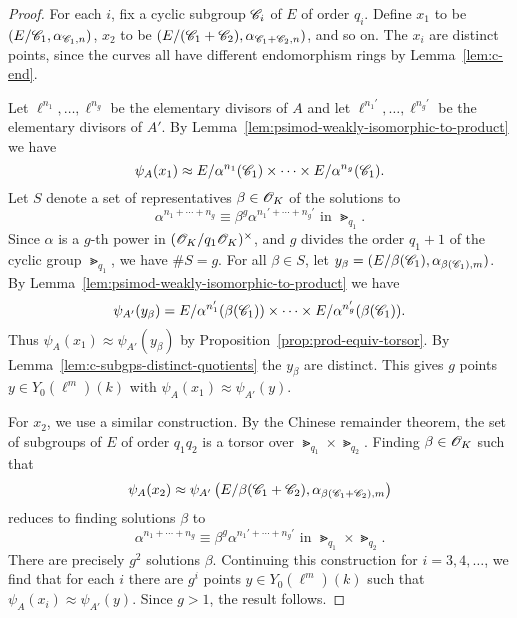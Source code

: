 \documentclass{amsart}
\begin{document}
\begin{proof}
    For each $i$, fix a cyclic subgroup $\mathscr{C}_i$ of $E$ of order $q_i$. Define $x_1$ to be $(E/\mathscr{C}_1,\alpha_{\mathscr{C}_1,n})$, $x_2$ to be $(E/(\mathscr{C}_1 + \mathscr{C}_2), \alpha_{\mathscr{C}_1 + \mathscr{C}_2,n})$, and so on. The $x_i$ are distinct points, since the curves all have different endomorphism rings by Lemma~\ref{lem:c-end}.

Let $\ell^{n_1},\dots,\ell^{n_g}$ be the elementary divisors of $A$  and let $\ell^{n_1'},\dots,\ell^{n_g'}$ be the elementary divisors of $A'$.
By Lemma~\ref{lem:psimod-weakly-isomorphic-to-product} we have $$\psi_{A}(x_1) \approx E/\alpha^{n_1}(\mathscr{C}_1) \times \cdots \times E/\alpha^{n_g}(\mathscr{C}_1).$$
    Let $S$ denote a set of representatives $\beta \in \mathscr{O}_K$ of the solutions to %
    \[
      \alpha^{n_1 + \cdots + n_g} \equiv \beta^g\alpha^{n_1' + \cdots + n_g'}
      \text{ in } \Gt_{q_1}.
    \]
Since $\alpha$ is a $g$-th power in  $(\mathscr{O}_K/q_1\mathscr{O}_K)^\times$, and  $g$ divides the order $q_1 + 1$ of the cyclic group $\Gt_{q_1}$,
   we have $\#S = g$. For all $\beta \in S$, let $y_\beta = (E/\beta(\mathscr{C}_1),\alpha_{\beta(\mathscr{C}_1),m})$. By Lemma~\ref{lem:psimod-weakly-isomorphic-to-product} we have $$\psi_{A'}(y_\beta) = E/\alpha^{n_1'}(\beta(\mathscr{C}_1)) \times \cdots \times E/\alpha^{n_g'}(\beta(\mathscr{C}_1)).$$ Thus $\psi_A(x_1) \approx \psi_{A'}(y_\beta)$ by Proposition~\ref{prop:prod-equiv-torsor}. By Lemma~\ref{lem:c-subgps-distinct-quotients} the $y_\beta$ are distinct. This gives $g$ points $y \in Y_0(\ell^m)(k)$ with $\psi_{A}(x_1) \approx \psi_{A'}(y)$.

  For $x_2$, we use a similar construction. By the Chinese remainder theorem, the set of subgroups of $E$ of order $q_1q_2$ is a torsor over $\Gt_{q_1} \times \Gt_{q_2}$. Finding $\beta \in \mathscr{O}_K$ such that
  \[
    \psi_{A}(x_2) \approx \psi_{A'}\left(E/\beta(\mathscr{C}_1+\mathscr{C}_2),\alpha_{\beta(\mathscr{C}_1+\mathscr{C}_2),m}\right)
  \]
  reduces to finding solutions $\beta$ to %
  \[
    \alpha^{n_1 + \cdots + n_g} \equiv \beta^g\alpha^{n_1' + \cdots + n_g'}
    \text{ in } \Gt_{q_1} \times \Gt_{q_2}.
  \]
There are precisely $g^2$ solutions $\beta$. Continuing this construction for $i=3,4,\dots$, we find that for each $i$ there are $g^i$ points $y \in Y_0(\ell^m)(k)$ such that $\psi_{A}(x_i) \approx \psi_{A'}(y)$. Since $g > 1$, the result follows.
\end{proof}
\end{document}
